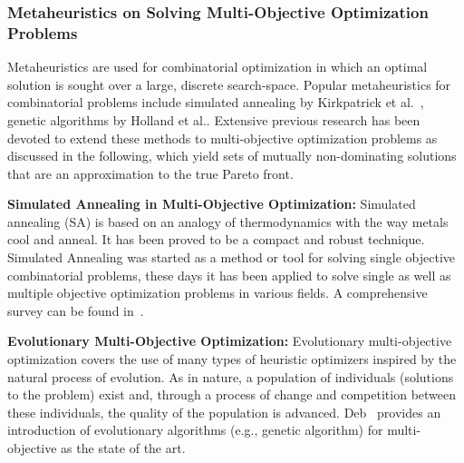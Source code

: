 \subsubsection{Metaheuristics on Solving Multi-Objective Optimization Problems}
Metaheuristics are used for combinatorial optimization in which an optimal solution is sought over a large, discrete search-space. Popular metaheuristics for combinatorial problems include simulated annealing by Kirkpatrick et al.~\cite{Kirkpatrick1987}, genetic algorithms by Holland et al.\cite{Holland1992}. Extensive previous research has been devoted to extend these methods to multi-objective optimization problems as discussed in the following, which yield sets of mutually non-dominating solutions that are an approximation to the true Pareto front. 

\textbf{Simulated Annealing in Multi-Objective Optimization:} Simulated annealing (SA) is based on an analogy of thermodynamics with the way metals cool and anneal. It has been proved to be a compact and robust technique. Simulated Annealing was started as a method or tool for solving single objective combinatorial problems, these days it has been applied to solve single as well as multiple objective optimization problems in various fields. A comprehensive survey can be found in~\cite{SumanSurvey}.

\textbf{Evolutionary Multi-Objective Optimization:} Evolutionary multi-objective optimization covers the use of many types of heuristic optimizers inspired by the natural process of evolution. As in nature, a population of individuals (solutions to the problem) exist and, through a process of change and competition between these individuals, the quality of the population is advanced. Deb~\cite{Deb2001} provides an introduction of evolutionary algorithms (e.g., genetic algorithm) for multi-objective as the state of the art.


